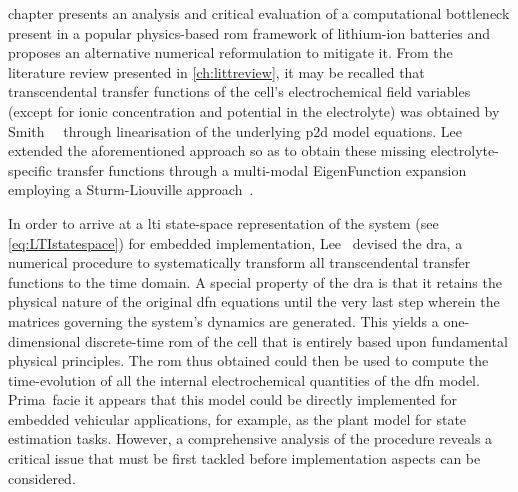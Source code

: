   chapter  presents  an  analysis  and  critical  evaluation
of  a computational  bottleneck  present in  a  popular physics-based  \gls{rom}
framework  of  lithium-ion  batteries  and  proposes  an  alternative  numerical
reformulation  to  mitigate   it.  From  the  literature   review  presented  in
\cref{ch:littreview},   it  may   be  recalled   that  transcendental   transfer
functions   of  the   cell's   electrochemical  field   variables  (except   for
ionic  concentration  and   potential  in  the  electrolyte)   was  obtained  by
Smith~\etal~\cite{Smith2007} through  linearisation of the  underlying \gls{p2d}
model equations.  Lee~\etal~\cite{Lee2012a,Lee2012} extended  the aforementioned
approach so as  to obtain these missing  electrolyte-specific transfer functions
through  a  multi-modal  EigenFunction  expansion  employing  a  Sturm-Liouville
approach~\cite{Pryce1993}.


In order to arrive at a  \gls{lti} state-space representation of the system (see
\cref{eq:LTIstatespace})  for embedded  implementation, Lee~\etal{}  devised the
\gls{dra}, a numerical procedure  to systematically transform all transcendental
transfer functions  to the time domain.  A special property of  the \gls{dra} is
that it  retains the physical nature  of the original \gls{dfn}  equations until
the very  last step  wherein the  matrices governing  the system's  dynamics are
generated. This  yields a  one-dimensional discrete-time  \gls{rom} of  the cell
that is entirely based upon  fundamental physical principles. The \gls{rom} thus
obtained could  then be used to  compute the time-evolution of  all the internal
electrochemical quantities of  the \gls{dfn} model. Prima~facie  it appears that
this model  could be directly  implemented for embedded  vehicular applications,
for  example,  as  the  plant  model for  state  estimation  tasks.  However,  a
comprehensive analysis  of the procedure reveals  a critical issue that  must be
first tackled before implementation aspects can be considered.

